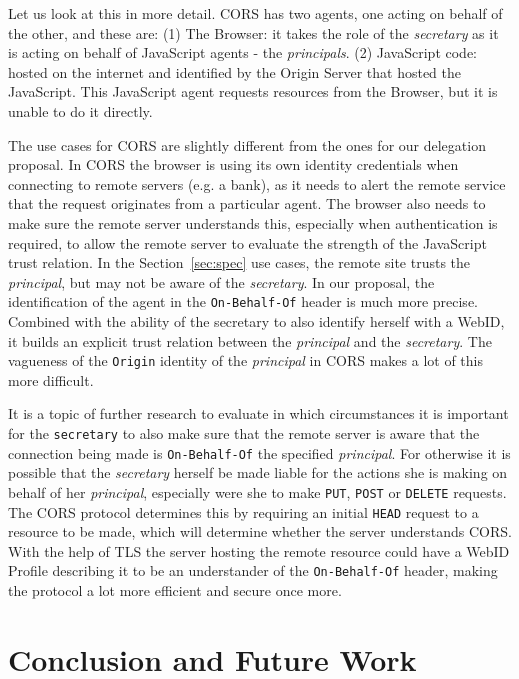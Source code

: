 \documentclass[a4paper]{llncs}
\begin{document}
Let us look at this in more detail.
CORS has two agents, one acting on behalf of the other, and these are: 
(1) The Browser: it takes the role of the \textit{secretary} as it is acting on behalf of JavaScript agents - the \textit{principals}.
(2) JavaScript code: hosted on the internet and identified by the Origin Server that hosted the JavaScript.
This JavaScript agent requests resources from the Browser, but it is unable to do it directly.

The use cases for CORS are slightly different from the ones for our delegation proposal. 
In CORS the browser is using its own identity credentials when connecting to remote servers (e.g. a bank), as it needs to alert the remote service that the request originates from a particular agent.
The browser also needs to make sure the remote server understands this, especially when authentication is required, to allow the remote server to evaluate the strength of the JavaScript trust relation.
In the Section~\ref{sec:spec} use cases, the remote site trusts the \textit{principal}, but may not be aware of the \textit{secretary}.
In our proposal, the identification of the agent in the \lstinline|On-Behalf-Of| header is much more precise.
Combined with the ability of the secretary to also identify herself with a WebID, it builds an explicit trust relation between the \textit{principal} and the \textit{secretary}. The vagueness of the \lstinline|Origin| identity of the \textit{principal} in CORS makes a lot of this more difficult.

It is a topic of further research to evaluate in which circumstances it is important for the \lstinline|secretary| to also make sure that the remote server is aware that the connection being made is \lstinline|On-Behalf-Of| the specified \textit{principal}. 
For otherwise it is possible that the \textit{secretary} herself be made liable for the actions she is making on behalf of her \textit{principal}, especially were she to make \texttt{PUT}, \texttt{POST} or \texttt{DELETE} requests. 
The CORS protocol determines this by  requiring an initial \texttt{HEAD} request to a resource to be made, which will determine whether the server understands CORS.
With the help of TLS the server hosting the remote resource could have a WebID Profile describing it to be an understander of the \lstinline|On-Behalf-Of| header, making the protocol a lot more efficient and secure once more.

\section{Conclusion and Future Work}\label{sec:conclusion}
\end{document}
